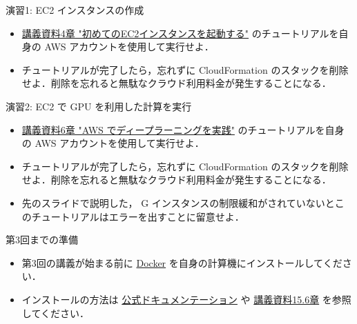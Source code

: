 \documentclass[unicode,11pt]{beamer}
\begin{document}
\begin{frame}{演習1: EC2 インスタンスの作成}

\begin{itemize}
    \item \href{https://tomomano.github.io/learn-aws-by-coding/#sec_first_ec2}{講義資料4章 "初めてのEC2インスタンスを起動する"} のチュートリアルを自身の AWS アカウントを使用して実行せよ．
    \item チュートリアルが完了したら，忘れずに CloudFormation のスタックを削除せよ．削除を忘れると無駄なクラウド利用料金が発生することになる．
\end{itemize}

\end{frame}

\begin{frame}{演習2: EC2 で GPU を利用した計算を実行}

\begin{itemize}
    \item \href{https://tomomano.github.io/learn-aws-by-coding/#sec_jupyter_and_deep_learning}{講義資料6章 "AWS でディープラーニングを実践"} のチュートリアルを自身の AWS アカウントを使用して実行せよ．
    \item チュートリアルが完了したら，忘れずに CloudFormation のスタックを削除せよ．削除を忘れると無駄なクラウド利用料金が発生することになる．
    \item 先のスライドで説明した， G インスタンスの制限緩和がされていないとこのチュートリアルはエラーを出すことに留意せよ．
\end{itemize}

\end{frame}

\begin{frame}{第3回までの準備}

\begin{itemize}
    \item 第3回の講義が始まる前に
    \href{https://www.docker.com/}{Docker}
    を自身の計算機にインストールしてください．
    \item インストールの方法は
    \href{https://docs.docker.com/engine/install/}{公式ドキュメンテーション}
    や
    \href{https://tomomano.github.io/learn-aws-by-coding/#sec:install_docker}{講義資料15.6章}
    を参照してください．
\end{itemize}
    
\end{frame}
\end{document}
